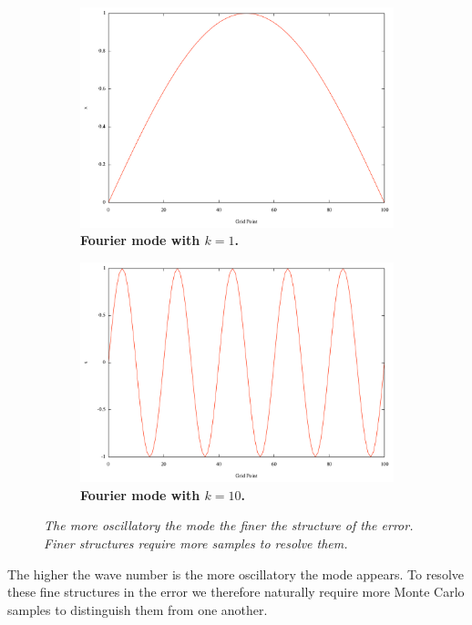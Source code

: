 \documentclass[note]{TechNote}
\begin{document}
\begin{figure}[h!]
  \centering
  \begin{subfigure}[b]{0.5\textwidth}
    \includegraphics[width=\textwidth]{mode_1.pdf}
    \caption{\textbf{Fourier mode with $k = 1$.}}
  \end{subfigure}
  \begin{subfigure}[b]{0.5\textwidth}
    \includegraphics[width=\textwidth]{mode_10.pdf}
    \caption{\textbf{Fourier mode with $k = 10$.}}
  \end{subfigure}
  \caption{\textit{The more oscillatory the mode the finer the
      structure of the error. Finer structures require more samples to
      resolve them.}}
  \label{fig:fourier_modes}
\end{figure}
The higher the wave number is the more oscillatory the mode
appears. To resolve these fine structures in the error we therefore
naturally require more Monte Carlo samples to distinguish them from
one another.
\end{document}
